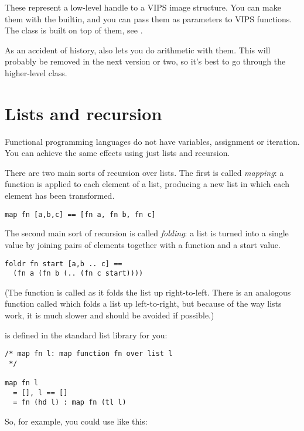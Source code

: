 These represent a low-level handle to a VIPS image structure. You can make
them with the  builtin, and you can pass them as parameters to
VIPS functions. The  class is built on top of them,
see .

As an accident of history, \nip{} also lets you do arithmetic with them. This
will probably be removed in the next version or two, so it's best to go
through the higher-level  class.

\section{Lists and recursion}

Functional programming languages do not have variables, assignment or
iteration. You can achieve the same effects using just lists and recursion.

There are two main sorts of recursion over lists. The first is called 
\emph{mapping}: a function is applied to each element of a list, producing
a new list in which each element has been transformed.

\begin{verbatim}
map fn [a,b,c] == [fn a, fn b, fn c]
\end{verbatim}

The second main sort of recursion is called \emph{folding}: a list is turned
into a single value by joining pairs of elements together with a function and
a start value.

\begin{verbatim}
foldr fn start [a,b .. c] == 
  (fn a (fn b (.. (fn c start))))
\end{verbatim}

\noindent
(The function is called  as it folds the list up right-to-left.
There is an analogous function called  which folds a list up
left-to-right, but because of the way lists work, it is much slower and should
be avoided if possible.)

 is defined in the standard list library for you:

\begin{verbatim}
/* map fn l: map function fn over list l
 */

map fn l
  = [], l == []
  = fn (hd l) : map fn (tl l) 
\end{verbatim}

\noindent
So, for example, you could use  like this:


